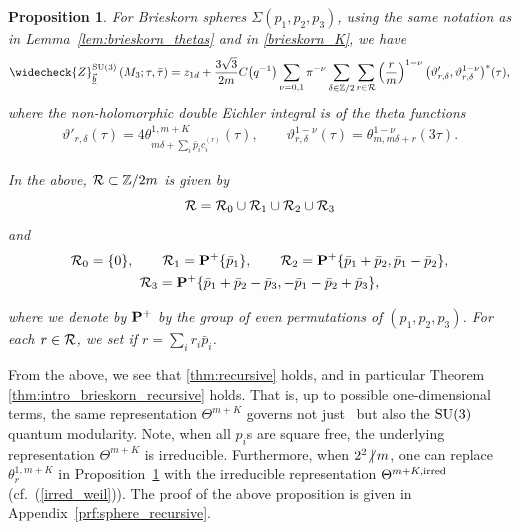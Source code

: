 \documentclass[10pt,a4paper]{amsart}
\def\BZ{\mathbb{Z}}
\newcommand{\ZZ}{\mathbb{Z}}
\newcommand{\Zchlong}[3]{\ensuremath{\widecheck{Z}^{#1}_{#2}\left(#3;\tau,\bar{\tau}\right)}}
\def\bv{{\vec{\underline{b}}}}
\newtheorem{prop}[thm]{Proposition}
\theoremstyle{definition}
\numberwithin{equation}{section}
\begin{document}
\begin{prop}\label{prop:sphere_recursive}
For Brieskorn spheres $\Sigma(p_1,p_2,p_3)$, using the same notation as in Lemma~{\rm \ref{lem:brieskorn_thetas}} and in \eqref{brieskorn_K}, we have
 \begin{gather*}%
 \Zchlong{{\rm SU}(3)}{\bv}{M_{3}}
 =z_{1d}+ \frac{3\sqrt{3}}{2m}C\bigl(q^{-1}\bigr) \sum_{\nu=0,1} \pi^{-\nu}	\sum_{\delta\in\BZ/2} \sum_{r\in {\cal R}} \left(\frac{r}{m}\right)^{1-\nu}\bigl(\vartheta'_{r,\delta},\vartheta^{1-\nu}_{r,\delta}\bigr)^\ast(\tau)
,
\end{gather*}
where the non-holomorphic double Eichler integral is of the theta functions
 \begin{gather*}
 \vartheta'_{r,\delta}(\tau)=
 4\theta^{1,m+K}_{m\delta+\sum_i \bar p_i c_i^{(r)}}(\tau),\qquad
 \vartheta^{1-\nu}_{r,\delta}(\tau) = \theta^{1-\nu}_{m,m\delta + r}(3\tau).
 \end{gather*}

In the above, ${\cal R} \subset \ZZ/2m$ is given by
\[
{\cal R} = {\cal R}_0\cup {\cal R}_1\cup {\cal R}_2\cup {\cal R}_3
\]
and
\begin{gather*}
 {\cal R}_0 = \{0\},\qquad
 {\cal R}_1 = {\bf P}^+ \{\bar p_1\},\qquad
 {\cal R}_2 = {\bf P}^+ \{\bar p_1+\bar p_2, \bar p_1-\bar p_2\},\\
 {\cal R}_3 = {\bf P}^+ \{\bar p_1+\bar p_2-\bar p_3, -\bar p_1-\bar p_2+\bar p_3\},
\end{gather*}

where we denote by ${\bf P}^+$ by the group of even permutations of $(p_1,p_2,p_3)$. For each $r\in {\cal R}$, we set  if $r=\sum_i r_i \bar p_i$.
\end{prop}


From the above, we see that \eqref{thm:recursive} holds, and in particular Theorem \ref{thm:intro_brieskorn_recursive} holds. That is, up to possible one-dimensional terms, the same \smash{$\widetilde{{\rm SL}_2(\BZ)}$} representation $\Theta^{m+K}$ governs not just~ but also the ${\rm SU}(3)$ quantum modularity. Note, when all $p_i$s are square free, the underlying representation $\Theta^{m+K}$ is irreducible. Furthermore, when $2^2{\not\hspace{2.5pt}\mid}\, m$, one can replace $\theta^{1,m+K}_r$ in Proposition~\ref{prop:sphere_recursive} with the irreducible representation $\Theta^{m+K,{\rm irred}}$ (cf.\ (\ref{irred_weil})). The proof of the above proposition is given in Appendix~\ref{prf:sphere_recursive}.
\end{document}
